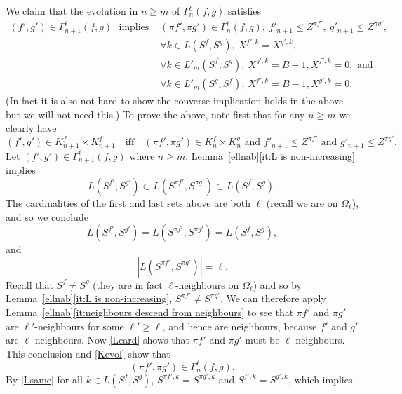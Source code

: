 \documentclass[12pt]{article}
\makeatletter
\renewenvironment{proof}[1][\proofname]{%
\par\pushQED{\qed}\normalfont%
\topsep6\p@\@plus6\p@\relax
\trivlist\item[\hskip\labelsep\bfseries#1\@addpunct{.}]%
\ignorespaces
}{%
\popQED\endtrivlist\@endpefalse
}
\numberwithin{theorem}{section}
\theoremstyle{def}
\numberwithin{equation}{section}
\makeatother
\begin{document}
\begin{proof}[Proof of Lemma~\ref{gammaext}]
We claim that the evolution in $n\ge m$ of  $\Gamma^\ell_n(f,g)$ satisfies
\begin{align}\label{gammaevol}
(f',g')\in \Gamma^\ell_{n+1}(f,g)\ \ \ \text{implies }&(\pi f',\pi g')\in\Gamma^\ell_n(f,g),\ f'_{n+1}\le Z^{\pi f'},\ g'_{n+1}\le Z^{\pi g'},\\ \nonumber&\forall k\in L(S^f,S^g), \ X^{f',k}=X^{g',k},\\
\nonumber&\forall k\in L'_m(S^f,S^g), \ X^{g',k}=B-1, X^{f',k}=0,\text{ and}\\
\nonumber&\forall k\in L'_m(S^g,S^f), \ X^{f',k}=B-1, X^{g',k}=0.
\end{align}
(In fact it is also not hard to show the converse implication holds in the above but we will not need this.)  To prove the above, note first that for any $n\ge m$ we clearly have
\begin{equation}\label{Kevol}
(f',g')\in K^f_{n+1}\times K^f_{n+1}\quad \text{iff} \quad (\pi f',\pi g')\in K^f_n\times K^g_n \text{ and } f'_{n+1}\le Z^{\pi f'}\text{ and }g'_{n+1}\le Z^{\pi g'}.
\end{equation}
Let $(f',g')\in \Gamma^\ell_{n+1}(f,g)$ where $n\ge m$. Lemma~\ref{ellnab}\ref{it:L is non-increasing} implies
\[L(S^{f'},S^{g'})\subset L(S^{\pi f'},S^{\pi g'})\subset L(S^f,S^g).\]
The cardinalities of the first and last sets above are both $\ell$ (recall we are on $\Omega_\ell$), and so we conclude
\begin{equation}\label{Lsame}
L(S^{f'},S^{g'})=L(S^{\pi f'},S^{\pi g'})=L(S^f,S^g),
\end{equation}
and
\begin{equation}\label{Lcard}
|L(S^{\pi f'},S^{\pi g'})|=\ell.
\end{equation}
Recall that $S^f\neq S^g$ (they are in fact $\ell$-neighbours on $\Omega_\ell$) and so by Lemma~\ref{ellnab}\ref{it:L is non-increasing}, $S^{\pi f'}\neq S^{\pi g'}$. 
We can therefore apply Lemma~\ref{ellnab}\ref{it:neighbours descend from neighbours} to see that $\pi f'$ and $\pi g'$ are $\ell'$-neighbours for some $\ell'\ge \ell$, and hence are neighbours, because $f'$ and $g'$ are $\ell$-neighbours.  
Now \eqref{Lcard} shows that $\pi f'$ and $\pi g'$ must be $\ell$-neighbours.  
This conclusion and \eqref{Kevol} show that 
\begin{equation}\label{piinG}
(\pi f',\pi g')\in \Gamma_n^\ell(f,g).
\end{equation}
By \eqref{Lsame} for all $k\in L(S^f,S^g)$, $S^{\pi f',k}=S^{\pi g',k}$ and $S^{f',k}=S^{g',k}$, which implies
\begin{equation}\label{equalonL}

\end{equation}
\end{proof}
\end{document}
